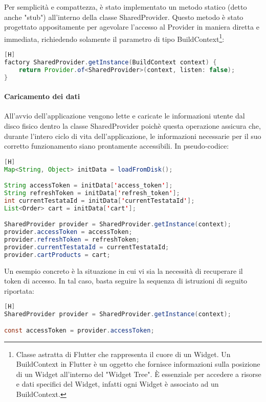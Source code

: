 \noindent
Per semplicità e compattezza, è stato implementato un metodo statico (detto anche "stub") all'interno della classe SharedProvider. Questo metodo è stato progettato appositamente per agevolare l'accesso al Provider in maniera diretta e immediata, richiedendo solamente il parametro di tipo BuildContext\footnote{Classe astratta di Flutter che rappresenta il cuore di un Widget. Un BuildContext in Flutter è un oggetto che fornisce informazioni sulla posizione di un Widget all'interno del "Widget Tree". È essenziale per accedere a risorse e dati specifici del Widget, infatti ogni Widget è associato ad un BuildContext.}:
\begin{lstlisting}[language=Java][H]
factory SharedProvider.getInstance(BuildContext context) {
	return Provider.of<SharedProvider>(context, listen: false);
}
\end{lstlisting}

\noindent
\paragraph{Caricamento dei dati}
All'avvio dell'applicazione vengono lette e caricate le informazioni utente dal disco fisico dentro la classe SharedProvider poichè questa operazione assicura che, durante l'intero ciclo di vita dell'applicazione, le informazioni necessarie per il suo corretto funzionamento siano prontamente accessibili. In pseudo-codice:
\begin{lstlisting}[language=Java, firstnumber=1][H]
Map<String, Object> initData = loadFromDisk();

String accessToken = initData['access_token'];
String refreshToken = initData['refresh_token'];
int currentTestataId = initData['currentTestataId'];
List<Order> cart = initData['cart'];

SharedProvider provider = SharedProvider.getInstance(context);
provider.accessToken = accessToken;
provider.refreshToken = refreshToken;
provider.currentTestataId = currentTestataId;
provider.cartProducts = cart;
\end{lstlisting}

\noindent
Un esempio concreto è la situazione in cui vi sia la necessità di recuperare il token di accesso. In tal caso, basta seguire la sequenza di istruzioni di seguito riportata:
\begin{lstlisting}[language=Java, firstnumber=1][H]
SharedProvider provider = SharedProvider.getInstance(context);

const accessToken = provider.accessToken;
\end{lstlisting}

